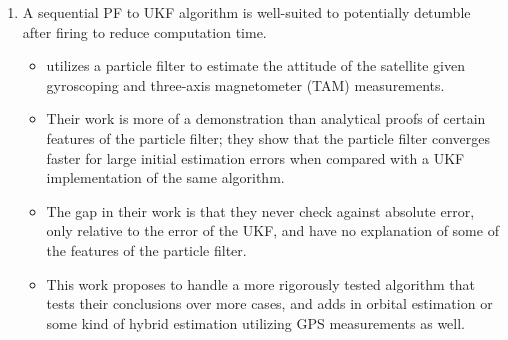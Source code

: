 \begin{enumerate}
\begin{itemize}
        \item \cite{zhangFinitetimeAttitudeSetpoint2020} demonstrates that once a set of burns for a maneuver is known (solved for there using a multi-objective PSO) the power-minimizing pointing objective can be found using a closed-form solution
        \item Their work is for a much larger satellite (gap) and does not require that a satellite maintains optimal pointing towards the sun at all times.
        \item Also assumes that we require a complex PSO solution to solve for the burn $\Delta v$ and times, which may be true if we need to make multiple burns to meet the orbital transfer goals that would be required.
        \item \cite{kristiansenEnergyOptimalAttitude2024} builds off existing work to form an non-linear optimization for maximizing power when slewing to a set of positions for both communication and payload tasks
        \item Their formulation is much more complex and utilizes a non-linear solver(IPOPT) to handle the optimal slewing, although they generate $\approx$ 40\% more energy over the entire maneuver while meeting their much more complex pointing requirements than this mission requires.
        \item They generate a good model of reaction wheel and magnetorquer dynamics which could be used in other formulations where we're trying to also balance loading with the propulsion system.
        \item This model lacks any type of pointing for propulsion: a highly-weighted objective should happen at the highest $v$ point to slew the satellite into the direction of motion of the bird.
    \end{itemize}
    \item A sequential PF to UKF algorithm is well-suited to potentially detumble after firing to reduce computation time.
    \begin{itemize}
        \item \cite{xue-yuanjiangSpacecraftAttitudeEstimation2005} utilizes a particle filter to estimate the attitude of the satellite given gyroscoping and three-axis magnetometer (TAM) measurements. 
        \item Their work is more of a demonstration than analytical proofs of certain features of the particle filter; they show that the particle filter converges faster for large initial estimation errors when compared with a UKF implementation of the same algorithm.
        \item The gap in their work is that they never check against absolute error, only relative to the error of the UKF, and have no explanation of some of the features of the particle filter.
        \item This work proposes to handle a more rigorously tested algorithm that tests their conclusions over more cases, and adds in orbital estimation or some kind of hybrid estimation utilizing GPS measurements as well.
    \end{itemize}
\end{enumerate}


